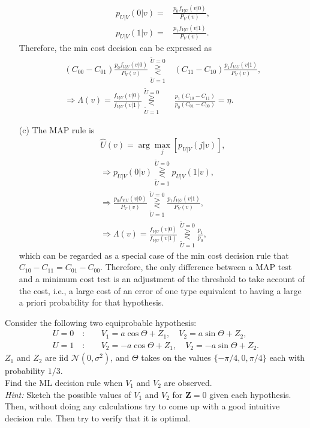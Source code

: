 \documentclass{assignment}
\begin{document}
\begin{sol}
\begin{itemize}
\begin{align}
            p_{U\vert V}(0\vert v)=&\frac{p_0f_{V\vert U}(v\vert 0)}{P_V(v)},\\
            p_{U\vert V}(1\vert v)=&\frac{p_1f_{V\vert U}(v\vert 1)}{P_V(v)}.
        \end{align}
        Therefore, the min cost decision can be expressed as
        \begin{align}
            (C_{00}-C_{01})\frac{p_0f_{V\vert U}(v\vert 0)}{P_V(v)}\overset{\tilde{U}=0}{\underset{\tilde{U}=1}{\gtreqless}}&(C_{11}-C_{10})\frac{p_1f_{V\vert U}(v\vert 1)}{P_V(v)},\\
            \Longrightarrow\Lambda(v)=\frac{f_{V\vert U}(v\vert 0)}{f_{V\vert U}(v\vert 1)}\overset{\tilde{U}=0}{\underset{\tilde{U}=1}{\gtreqless}}&\frac{p_1(C_{10}-C_{11})}{p_0(C_{01}-C_{00})}=\eta.
        \end{align}
        \item[(c)] The MAP rule is
        \begin{align}
            \hat{U}(v)=\arg\max_j[p_{U\vert V}(j\vert v)],\\
            \Longrightarrow p_{U\vert V}(0\vert v)\overset{\tilde{U}=0}{\underset{\tilde{U}=1}{\gtreqless}}p_{U\vert V}(1\vert v),\\
            \Longrightarrow\frac{p_0f_{V\vert U}(v\vert 0)}{P_V(v)}\overset{\tilde{U}=0}{\underset{\tilde{U}=1}{\gtreqless}}\frac{p_1f_{V\vert U}(v\vert 1)}{P_V(v)},\\
            \Longrightarrow\Lambda(v)=\frac{f_{V\vert U}(v\vert 0)}{f_{V\vert U}(v\vert 1)}\overset{\tilde{U}=0}{\underset{\tilde{U}=1}{\gtreqless}}\frac{p_1}{p_0},
        \end{align}
        which can be regarded as a special case of the min cost decision rule that $C_{10}-C_{11}=C_{01}-C_{00}$. Therefore, the only difference between a MAP test and a minimum cost test is an adjustment of the threshold to take account of the cost, i.e., a large cost of an error of one type equivalent to having a large a priori probability for that hypothesis.
    \end{itemize}
\end{sol}

\begin{prob}
    Consider the following two equiprobable hypothesis:
    \begin{align*}
        U=0\quad:&\quad V_1=a\cos\Theta+Z_1,\quad V_2=a\sin\Theta+Z_2,\\
        U=1\quad:&\quad V_2=-a\cos\Theta+Z_1,\quad V_2=-a\sin\Theta+Z_2.
    \end{align*}
    $Z_1$ and $Z_2$ are iid $\mathcal{N}(0,\sigma^2)$, and $\Theta$ takes on the values $\{-\pi/4,0,\pi/4\}$ each with probability $1/3$.\\
    Find the ML decision rule when $V_1$ and $V_2$ are observed.\\
    \emph{Hint:} Sketch the possible values of $V_1$ and $V_2$ for $\bm{Z}=0$ given each hypothesis. Then, without doing any calculations try to come up with a good intuitive decision rule. Then try to verify that it is optimal.
\end{prob}
\begin{sol}
    
\end{sol}
\end{document}
